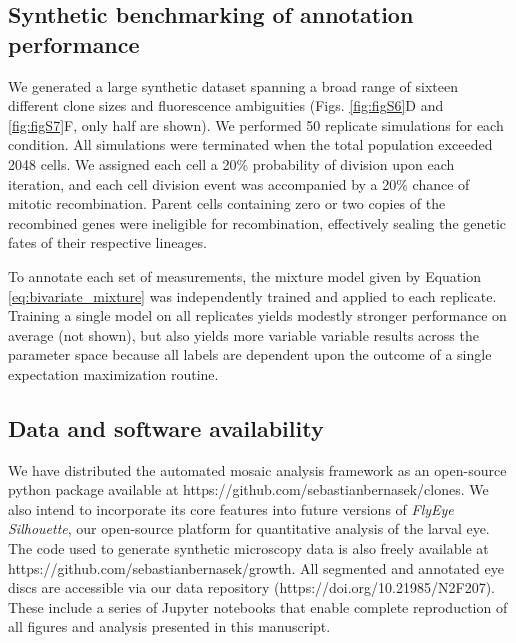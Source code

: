\subsection{Synthetic benchmarking of annotation performance}

We generated a large synthetic dataset spanning a broad range of sixteen different clone sizes and fluorescence ambiguities (Figs. \ref{fig:figS6}D and \ref{fig:figS7}F, only half are shown). We performed 50 replicate simulations for each condition. All simulations were terminated when the total population exceeded 2048 cells. We assigned each cell a 20\% probability of division upon each iteration, and each cell division event was accompanied by a 20\% chance of mitotic recombination. Parent cells containing zero or two copies of the recombined genes were ineligible for recombination, effectively sealing the genetic fates of their respective lineages. 

To annotate each set of measurements, the mixture model given by Equation \ref{eq:bivariate_mixture} was independently trained and applied to each replicate. Training a single model on all replicates yields modestly stronger performance on average (not shown), but also yields more variable variable results across the parameter space because all labels are dependent upon the outcome of a single expectation maximization routine. 


\subsection{Data and software availability}

We have distributed the automated mosaic analysis framework as an open-source python package available at https://github.com/sebastianbernasek/clones. We also intend to incorporate its core features into future versions of \textit{FlyEye Silhouette}, our open-source platform for quantitative analysis of the larval eye. The code used to generate synthetic microscopy data is also freely available at https://github.com/sebastianbernasek/growth. All segmented and annotated eye discs are accessible via our data repository (https://doi.org/10.21985/N2F207). These include a series of Jupyter notebooks that enable complete reproduction of all figures and analysis presented in this manuscript.
